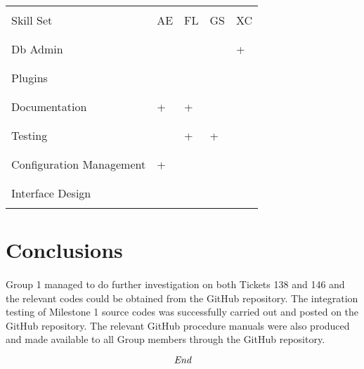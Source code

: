 \documentclass[oneside, 10pt, a4]{article}
\begin{document}
\begin{table}[ht!]
\begin{tabular}{|p{5cm}|p{1cm}|p{1cm}|p{1cm}|p{1cm}|} 
\hline
 & & & & \\
Skill Set & AE & FL & GS & XC\\
 & & & & \\
\hline
 & & & & \\
Db Admin & & & & +\\
 & & & & \\
\hline
 & & & & \\
Plugins & & & & \\
 & & & & \\
\hline
 & & & & \\
Documentation & + & + & & \\
 & & & & \\
\hline
 & & & & \\
Testing & & + & + & \\
 & & & & \\
\hline
 & & & & \\
Configuration Management & + & & &\\
 & & & & \\
\hline
 & & & & \\
Interface Design & & & & \\
 & & & & \\
\hline
\end{tabular}
\end{table}

\section{Conclusions}

\paragraph{}
Group 1 managed to do further investigation on both Tickets 138 and 146 and the 
relevant codes could be obtained from the GitHub repository. The integration testing of 
Milestone 1 source codes was successfully carried out and posted on the GitHub repository.
 The relevant GitHub procedure manuals were also produced and made available to all Group members 
 through the GitHub repository.

\[\emph{End}\]
\end{document}
